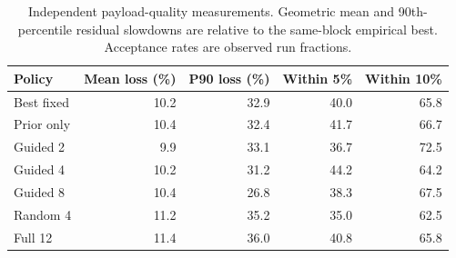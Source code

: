 \begin{table}[t]
\centering\small
\caption{Independent payload-quality measurements. Geometric mean and 90th-percentile residual slowdowns are relative to the same-block empirical best. Acceptance rates are observed run fractions.}
\label{tab:quality}
\begin{tabular}{lrrrr}
\hline
Policy & Mean loss (\%) & P90 loss (\%) & Within 5\% & Within 10\%\\
\hline
Best fixed & 10.2 & 32.9 & 40.0 & 65.8 \\
Prior only & 10.4 & 32.4 & 41.7 & 66.7 \\
Guided 2 & 9.9 & 33.1 & 36.7 & 72.5 \\
Guided 4 & 10.2 & 31.2 & 44.2 & 64.2 \\
Guided 8 & 10.4 & 26.8 & 38.3 & 67.5 \\
Random 4 & 11.2 & 35.2 & 35.0 & 62.5 \\
Full 12 & 11.4 & 36.0 & 40.8 & 65.8 \\
\hline
\end{tabular}
\end{table}
